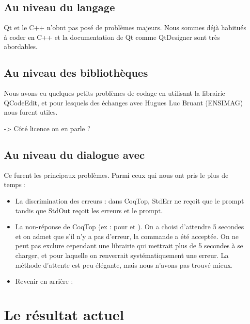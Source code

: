 \subsection{Au niveau du langage}

Qt et le C++ n'obnt pas posé de problèmes majeurs. Nous sommes déjà habitués à coder en C++ et la documentation de Qt comme QtDesigner sont très abordables.
    
\subsection{Au niveau des bibliothèques}

Nous avons eu quelques petits problèmes de codage en utilisant la librairie QCodeEdit, et pour lesquels des échanges avec Hugues Luc Bruant (ENSIMAG) nous furent utiles.


-> Côté licence on en parle ?

\subsection{Au niveau du dialogue avec \Coq{}}

Ce furent les principaux problèmes. Parmi ceux qui nous ont pris le plus de temps :

\begin{itemize}
  \item La discrimination des erreurs : dans CoqTop, StdErr ne reçoit que le prompt tandis que StdOut reçoit les erreurs et le prompt. 
  \item La non-réponse de CoqTop (ex : pour  et ). On a choisi d'attendre 5 secondes et on admet que s'il n'y a pas d'erreur, la commande a été acceptée. On ne peut pas exclure cependant une librairie qui mettrait plus de 5 secondes à se charger, et pour laquelle on renverrait systématiquement une erreur. La méthode d'attente est peu élégante, mais nous n'avons pas trouvé mieux.
  \item Revenir en arrière : 
\end{itemize}

        
\section{Le résultat actuel}

